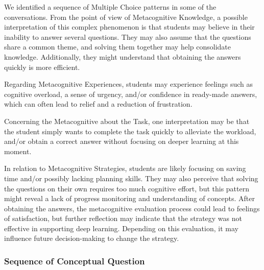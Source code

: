 \documentclass[a4paper,twoside]{article}
\begin{document}
We identified a sequence of Multiple Choice patterns in some of the
conversations. From the point of view of Metacognitive Knowledge, a possible
interpretation of this complex phenomenon is that students may believe in their
inability to answer several questions. They may also assume that the questions
share a common theme, and solving them together may help consolidate knowledge.
Additionally, they might understand that obtaining the answers quickly is more
efficient.

Regarding Metacognitive Experiences, students may experience feelings such as
cognitive overload, a sense of urgency, and/or confidence in ready-made answers,
which can often lead to relief and a reduction of frustration.

Concerning the Metacognitive about the Task, one interpretation may be that the
student simply wants to complete the task quickly to alleviate the workload,
and/or obtain a correct answer without focusing on deeper learning at
this moment.

In relation to Metacognitive Strategies, students are likely focusing on saving
time and/or possibly lacking planning skills. They may also perceive that
solving the questions on their own requires too much cognitive effort, but this
pattern might reveal a lack of progress monitoring and understanding of
concepts. After obtaining the answers, the metacognitive evaluation process
could lead to feelings of satisfaction, but further reflection may indicate that
the strategy was not effective in supporting deep learning. Depending on this
evaluation, it may influence future decision-making to change the strategy.

\subsubsection*{Sequence of Conceptual Question}
\end{document}
